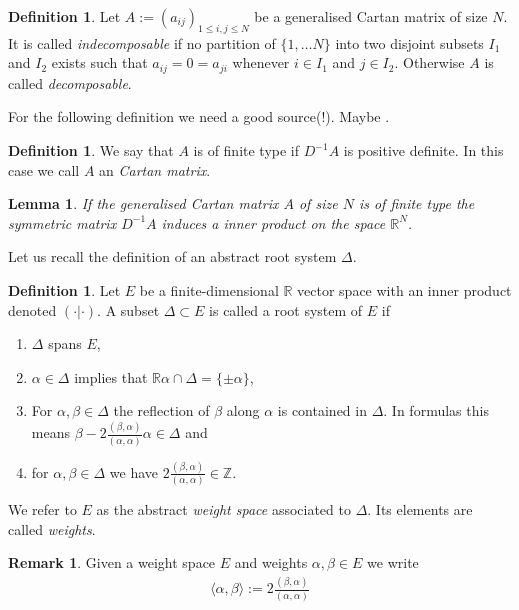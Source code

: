 \documentclass{amsart}
\newtheorem{lemma}[theorem]{Lemma}
\theoremstyle{definition}
\newtheorem{definition}[theorem]{Definition}
\newtheorem*{remark}{Remark}
\begin{document}
\begin{definition}{\cite[p. 4 ]{Kumar2002}}
	Let $A:= (a_{ij})_{1 \leq i,j \leq N}$ be a generalised Cartan matrix of size $N$. It is called \emph{indecomposable} if no partition of $\{1,\dotsc N\}$ into two disjoint subsets $I_1$ and $I_2$ exists such that
	$ a_{ij} = 0 = a_{ji} $ whenever $i \in I_1$ and $j\in I_2$.
	Otherwise $A$ is called \emph{decomposable}.
\end{definition}

For the following definition we need a good source(!). Maybe \cite[Chapter 4]{Kac1990}.
\begin{definition}
	We say that $A$ is of finite type if $D^{-1}A$ is positive definite.
	In this case we call $A$ an \emph{Cartan matrix}.
\end{definition}

\begin{lemma}
	If the generalised Cartan matrix $A$ of size $N$ is of finite type the symmetric matrix $D^{-1}A$ induces a inner product on the space $\mathbb R^N$.
\end{lemma}

Let us recall the definition of an abstract root system $\Delta$.
\begin{definition}
	Let $E$ be a finite-dimensional $\mathbb R$ vector space with an inner product denoted $( \cdot | \cdot )$.
	A subset $\Delta\subset E$ is called a root system of $E$ if
	\begin{enumerate}
		\item $\Delta$ spans $E$,
		\item $\alpha \in \Delta$ implies that $\mathbb R \alpha \cap \Delta = \{ \pm \alpha \}$,
		\item For $\alpha, \beta \in \Delta$ the reflection of $\beta$ along $\alpha$ is contained in $\Delta$. In formulas this means
		$\beta - 2 \frac{(\beta, \alpha)}{(\alpha, \alpha)} \alpha \in \Delta$ and
		\item  for $\alpha,\beta \in \Delta$ we have  $2 \frac{(\beta, \alpha)}{(\alpha, \alpha)}  \in \mathbb Z$.
	\end{enumerate}
	We refer to $E$ as the abstract \emph{weight space} associated to $\Delta$. Its elements are called \emph{weights}.
\end{definition}

\begin{remark}
	Given a weight space $E$ and weights $\alpha, \beta \in E$ we write
	\begin{align}
		\langle \alpha, \beta \rangle := 2 \frac{(\beta, \alpha)}{(\alpha, \alpha)}
	\end{align}
\end{remark}
\end{document}
